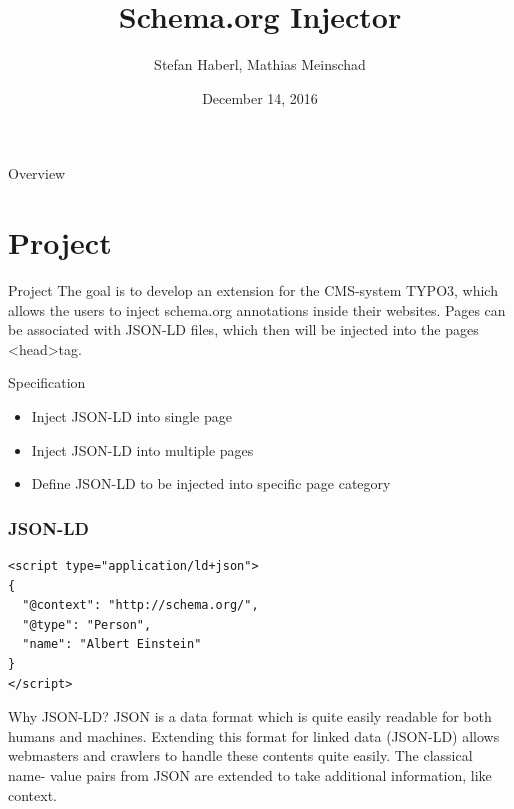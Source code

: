 \documentclass{beamer}
\title{Schema.org Injector}
\author{Stefan Haberl, Mathias Meinschad}
\institute{STI Innsbruck}
\date{December 14, 2016}
\begin{document}
\begin{frame}
  \titlepage
\end{frame}

\begin{frame}{Overview}
  \tableofcontents
\end{frame}

\section{Project}

\begin{frame}{Project}
The goal is to develop an extension for the CMS-system TYPO3, which allows the users to inject schema.org annotations inside their websites.
Pages can be associated with JSON-LD files, which then will be injected into the pages \textless head\textgreater{tag}. 



\begin{block}{Specification}
\begin{itemize}
\item Inject JSON-LD into single page
\item Inject JSON-LD into multiple pages
\item Define JSON-LD to be injected into specific page category
\end{itemize}
\end{block}
\end{frame}


\begin{frame}[fragile]
\frametitle{JSON-LD}
\begin{block}{}
\begin{lstlisting}
<script type="application/ld+json">
{
  "@context": "http://schema.org/",
  "@type": "Person",
  "name": "Albert Einstein"
}
</script>
\end{lstlisting}
\end{block}
\begin{block}{Why JSON-LD?}
JSON is a data format which is quite easily readable for both humans and machines.
Extending this format for linked data (JSON-LD) allows webmasters and crawlers to handle these contents quite easily. The classical name- value pairs from JSON are extended to take additional information, like context.
\end{block}

\end{frame}
\end{document}
